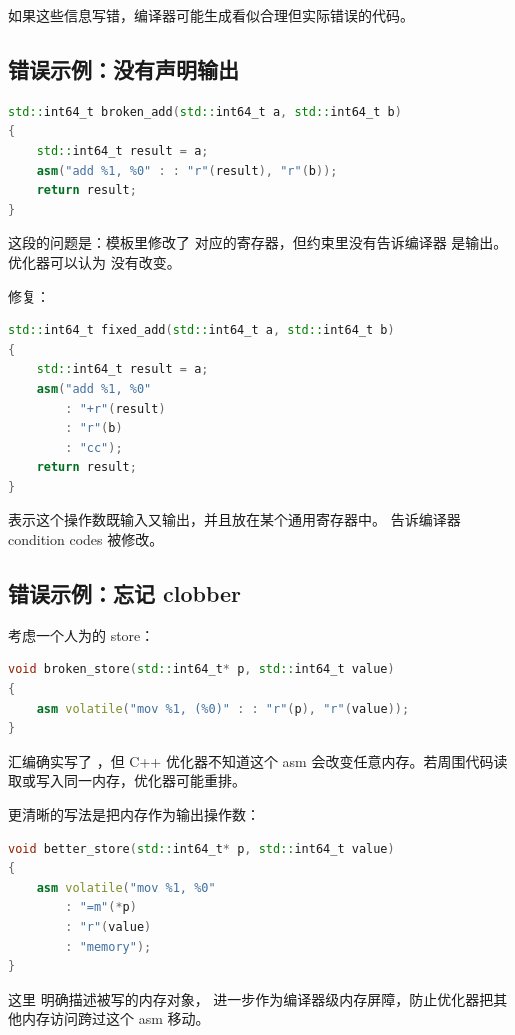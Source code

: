 如果这些信息写错，编译器可能生成看似合理但实际错误的代码。

\subsection{错误示例：没有声明输出}

\begin{lstlisting}[language=C++]
std::int64_t broken_add(std::int64_t a, std::int64_t b)
{
    std::int64_t result = a;
    asm("add %1, %0" : : "r"(result), "r"(b));
    return result;
}
\end{lstlisting}

这段的问题是：模板里修改了  对应的寄存器，但约束里没有告诉编译器  是输出。优化器可以认为  没有改变。

修复：

\begin{lstlisting}[language=C++]
std::int64_t fixed_add(std::int64_t a, std::int64_t b)
{
    std::int64_t result = a;
    asm("add %1, %0"
        : "+r"(result)
        : "r"(b)
        : "cc");
    return result;
}
\end{lstlisting}

 表示这个操作数既输入又输出，并且放在某个通用寄存器中。 告诉编译器 condition codes 被修改。

\subsection{错误示例：忘记  clobber}

考虑一个人为的 store：

\begin{lstlisting}[language=C++]
void broken_store(std::int64_t* p, std::int64_t value)
{
    asm volatile("mov %1, (%0)" : : "r"(p), "r"(value));
}
\end{lstlisting}

汇编确实写了 ，但 C++ 优化器不知道这个 asm 会改变任意内存。若周围代码读取或写入同一内存，优化器可能重排。

更清晰的写法是把内存作为输出操作数：

\begin{lstlisting}[language=C++]
void better_store(std::int64_t* p, std::int64_t value)
{
    asm volatile("mov %1, %0"
        : "=m"(*p)
        : "r"(value)
        : "memory");
}
\end{lstlisting}

这里  明确描述被写的内存对象， 进一步作为编译器级内存屏障，防止优化器把其他内存访问跨过这个 asm 移动。

